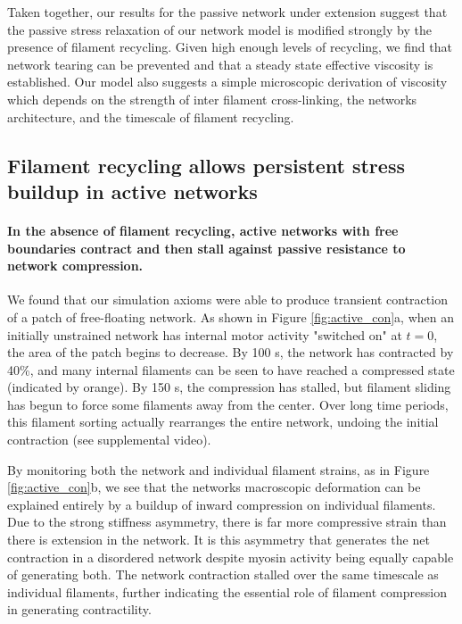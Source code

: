 \documentclass[10pt,letterpaper]{article}
\begin{document}
Taken together, our results for the passive network under extension suggest that the passive stress relaxation of our network model is modified strongly by the presence of filament recycling. Given high enough levels of recycling, we find that network tearing can be prevented and that a steady state effective viscosity is established. Our model also suggests a simple microscopic derivation of viscosity which depends on the strength of inter filament cross-linking, the networks architecture, and the timescale of filament recycling.








\subsection*{Filament recycling allows persistent stress buildup in active networks}

\paragraph{In the absence of filament recycling, active networks with free boundaries contract and then stall against passive resistance to network compression.}


We found that our simulation axioms were able to produce transient contraction of a patch of free-floating network.  As shown in Figure \ref{fig:active_con}a, when an initially unstrained network has internal motor activity "switched on" at $t=0$, the area of the patch begins to decrease.  By 100 s, the network has contracted by 40\%, and many internal filaments can be seen to have reached a compressed state (indicated by orange).  By 150 s, the compression has stalled, but filament sliding has begun to force some filaments away from the center. Over long time periods, this filament sorting actually rearranges the entire network, undoing the initial contraction (see supplemental video).

By monitoring both the network and individual filament strains, as in Figure \ref{fig:active_con}b, we see that the networks macroscopic deformation can be explained entirely by a buildup of inward compression on individual filaments.  Due to the strong stiffness asymmetry, there is far more compressive strain than there is extension in the network. It is this asymmetry that generates the net contraction in a disordered network despite myosin activity being equally capable of generating both.  The network contraction stalled over the same timescale as individual filaments, further indicating the essential role of filament compression in generating contractility.  
\end{document}
